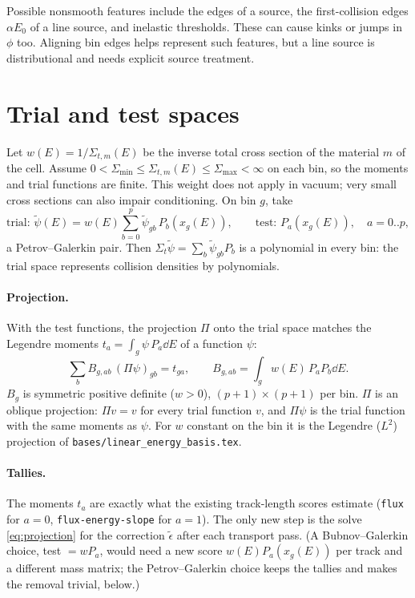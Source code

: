 \documentclass[11pt]{article}
\newcommand{\tpsi}{\tilde\psi}
\newcommand{\teps}{\tilde\epsilon}
\newcommand{\Sigt}{\Sigma_t}
\begin{document}
Possible nonsmooth features include the edges of a source, the
first-collision edges $\alpha E_0$ of a line source, and inelastic thresholds. These
can cause kinks or jumps in $\phi$ too. Aligning bin edges helps represent such
features, but a line source is distributional and needs explicit source treatment.

\section{Trial and test spaces}

Let $w(E) = 1/\Sigma_{t,m}(E)$ be the inverse total cross section of the material $m$
of the cell. Assume $0<\Sigma_{\min}\le\Sigma_{t,m}(E)\le\Sigma_{\max}<\infty$
on each bin, so the moments and trial functions are finite. This weight does not
apply in vacuum; very small cross sections can also impair conditioning.
On bin $g$, take
\begin{equation}
  \text{trial: } \tpsi(E) = w(E)\sum_{b=0}^{p}\tpsi_{gb}\,P_b(x_g(E)),\qquad
  \text{test: } P_a(x_g(E)),\quad a = 0..p,
\end{equation}
a Petrov--Galerkin pair. Then $\Sigt\tpsi = \sum_b \tpsi_{gb}P_b$ is a polynomial in
every bin: the trial space represents collision densities by polynomials.

\paragraph{Projection.} With the test functions, the projection $\Pi$ onto the trial
space matches the Legendre moments $t_a = \int_g\psi\,P_a\dd E$ of a function $\psi$:
\begin{equation}
  \sum_b B_{g,ab}\,(\Pi\psi)_{gb} = t_{ga},\qquad
  B_{g,ab} = \int_g w(E)\,P_aP_b\dd E .
  \label{eq:projection}
\end{equation}
$B_g$ is symmetric positive definite ($w>0$), $(p+1)\times(p+1)$ per bin. $\Pi$ is an
oblique projection: $\Pi v = v$ for every trial function $v$, and $\Pi\psi$ is the trial
function with the same moments as $\psi$. For $w$ constant on the bin it is the
Legendre ($L^2$) projection of \texttt{bases/linear\_energy\_basis.tex}.

\paragraph{Tallies.} The moments $t_a$ are exactly what the existing track-length scores
estimate (\texttt{flux} for $a=0$, \texttt{flux-energy-slope} for $a=1$). The only new
step is the solve \eqref{eq:projection} for the correction $\teps$ after each transport
pass. (A Bubnov--Galerkin choice, test $= wP_a$, would need a new score
$w(E)P_a(x_g(E))$ per track and a different mass matrix; the Petrov--Galerkin choice
keeps the tallies and makes the removal trivial, below.)
\end{document}
